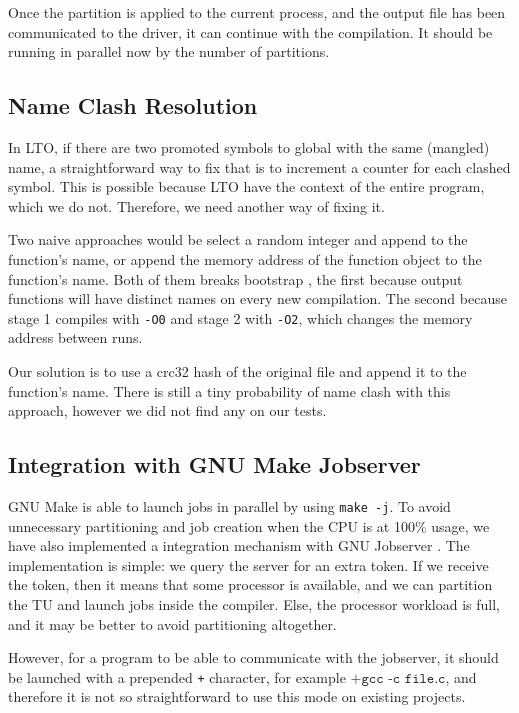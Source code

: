 \documentclass[runningheads]{llncs}
\begin{document}
Once the partition is applied to the current process, and the output file has
been communicated to the driver, it can continue with the compilation. It
should be running in parallel now by the number of partitions.

\subsection{Name Clash Resolution}\label{sec:name_clash_resolution}

In LTO, if there are two promoted symbols to global with the same (mangled) name, a
straightforward way to fix that is to increment a counter for each clashed
symbol. This is possible because LTO have the context of the entire program,
which we do not. Therefore, we need another way of fixing it.

Two naive approaches would be select a random integer and append to the
function's name, or append the memory address of the function object to the
function's name.  Both of them breaks bootstrap \cite{bootstrap}, the first
because output functions will have distinct names on every new compilation. The
second because stage 1 compiles with \texttt{-O0} and stage 2 with
\texttt{-O2}, which changes the memory address between runs.

Our solution is to use a crc32 hash of the original file and append it to the
function's name.  There is still a tiny probability of name clash with this
approach, however we did not find any on our tests.

\subsection{Integration with GNU Make Jobserver}\label{sec:integration_jobserver}

GNU Make is able to launch jobs in parallel by using \texttt{make -j}.  To
avoid unnecessary partitioning and job creation when the CPU is at 100\% usage,
we have also implemented a integration mechanism with GNU Jobserver
\cite{posixjobserver}.  The implementation is simple: we query the server for
an extra token. If we receive the token, then it means that some processor is
available, and we can partition the TU and launch jobs inside the compiler.
Else, the processor workload is full, and it may be better to avoid
partitioning altogether.

However, for a program to be able to communicate with the jobserver,
it should be launched with a prepended \texttt{+} character,
for example $\texttt{+gcc -c file.c}$, and therefore it is not
so straightforward to use this mode on existing projects.
\end{document}
